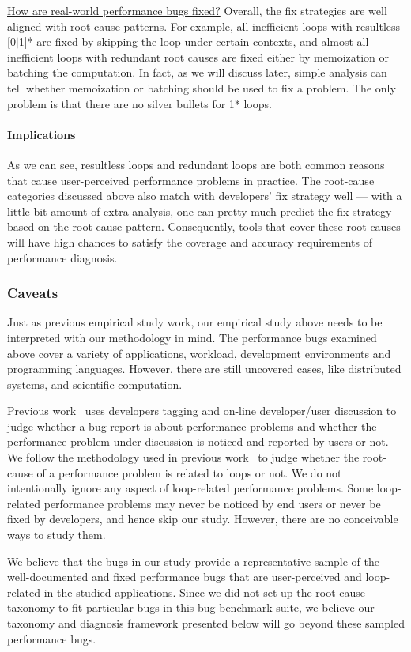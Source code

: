 \underline{How are real-world performance bugs fixed?}
Overall, the fix strategies are well aligned with root-cause patterns.
For example, 
all inefficient loops with resultless [0$|$1]* are
fixed by skipping the loop under certain contexts,
and almost all inefficient loops with redundant root causes are fixed either by 
memoization or batching the computation. 
In fact, as we will discuss later, simple analysis can tell whether 
memoization or batching should be used to fix a problem.
The only problem is that there are no silver bullets for 1* loops.

\paragraph{Implications}
As we can see, resultless loops and redundant loops are both common reasons
that cause user-perceived performance problems in practice. The root-cause
categories discussed above also match with developers' fix strategy well ---
with a little bit amount of extra analysis, one can pretty much predict the fix strategy based on the root-cause pattern.
Consequently, tools that cover these root causes will have high
chances to satisfy the coverage and accuracy requirements of performance 
diagnosis.


\subsubsection{Caveats} 
Just as previous empirical study work, 
our empirical study above needs to be interpreted with our methodology in mind. 
The performance bugs examined above cover a variety of applications, workload, 
development environments and programming languages. 
However, there are still uncovered cases, like distributed systems, 
and scientific computation. 

Previous work~\citep{PerfBug, SongOOPSLA2014} uses developers tagging and
on-line developer/user discussion to judge whether a bug report is about
performance problems and whether 
the performance problem under discussion is noticed and reported by users
or not.
We follow the methodology used in previous work~\citep{SongOOPSLA2014} to judge 
whether the root-cause of a performance problem is related to loops or not.
We do not intentionally ignore any aspect of loop-related performance problems. 
Some loop-related performance problems may never be noticed by end users
or never be fixed by developers, and hence skip our study. However,
there are no conceivable ways to study them. 

We believe that the bugs in our study provide a representative sample of the 
well-documented and
fixed performance bugs that are user-perceived and loop-related in the studied 
applications. 
Since we did not set up the root-cause taxonomy to fit particular
bugs in this bug benchmark suite, we believe our taxonomy and diagnosis
framework presented below will go beyond these sampled performance bugs. 

